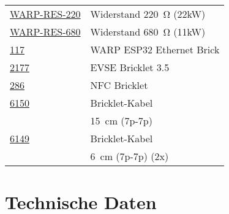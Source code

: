 \documentclass[a4paper,10pt]{article}
\begin{document}
\begin{multicols*}{2}
{\begin{tabular}{ll}
        \href{https://www.tinkerforge.com/de/shop/warp/warp3-spare-parts/}{WARP-RES-220}											& Widerstand \SI{220}{\ohm} (22kW)           \\
        \cmidrule(lr{0.5em}){1-2}
        \href{https://www.tinkerforge.com/de/shop/warp/warp3-spare-parts/}{WARP-RES-680}											& Widerstand \SI{680}{\ohm} (11kW)            \\
        \cmidrule(lr{0.5em}){1-2}
        \href{https://www.tinkerforge.com/de/shop/warp/warp3-spare-parts/}{117}														& WARP ESP32 Ethernet Brick                 \\
        \cmidrule(lr{0.5em}){1-2}
        \href{https://www.tinkerforge.com/de/shop/warp/warp3-spare-parts/}{2177}													& EVSE Bricklet 3.5                    \\
        \cmidrule(lr{0.5em}){1-2}
        \href{https://www.tinkerforge.com/de/shop/warp/warp3-spare-parts/}{286}  				                                    & NFC Bricklet                         \\
        \cmidrule(lr{0.5em}){1-2}
        \href{https://www.tinkerforge.com/de/shop/warp/warp3-spare-parts/}{6150}													& Bricklet-Kabel                       \\
                                                                                                                                    & \SI{15}{\centi\meter} (7p-7p)        \\
        \cmidrule(lr{0.5em}){1-2}
        \href{https://www.tinkerforge.com/de/shop/warp/warp3-spare-parts/}{6149}													& Bricklet-Kabel                       \\
                                                                                                                                    & \SI{6}{\centi\meter} (7p-7p) (2x)\\
        \bottomrule
    \end{tabular}
	}

    \newpage
    \section{Technische Daten}
    \begin{minipage}{\linewidth}


\end{minipage}
\end{multicols*}
\end{document}
